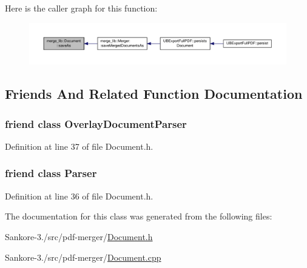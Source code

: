 Here is the caller graph for this function\-:
\nopagebreak
\begin{figure}[H]
\begin{center}
\leavevmode
\includegraphics[width=350pt]{dc/d2e/classmerge__lib_1_1_document_a6687738a8f98a95f3cafbfca7dd7c928_icgraph}
\end{center}
\end{figure}




\subsection{Friends And Related Function Documentation}
\hypertarget{classmerge__lib_1_1_document_ae318f0237f597449fb740d73ff4eaadd}{
\subsubsection[{Overlay\-Document\-Parser}]{\setlength{\rightskip}{0pt plus 5cm}friend class {\bf Overlay\-Document\-Parser}\hspace{0.3cm}{\ttfamily [friend]}}}\label{dc/d2e/classmerge__lib_1_1_document_ae318f0237f597449fb740d73ff4eaadd}


Definition at line 37 of file Document.\-h.

\hypertarget{classmerge__lib_1_1_document_ab80291af9c262f63b83fa9c16f12014d}{
\subsubsection[{Parser}]{\setlength{\rightskip}{0pt plus 5cm}friend class {\bf Parser}\hspace{0.3cm}{\ttfamily [friend]}}}\label{dc/d2e/classmerge__lib_1_1_document_ab80291af9c262f63b83fa9c16f12014d}


Definition at line 36 of file Document.\-h.



The documentation for this class was generated from the following files\-:\begin{DoxyCompactItemize}
\item 
Sankore-\/3./src/pdf-\/merger/\hyperlink{_document_8h}{Document.\-h}\item 
Sankore-\/3./src/pdf-\/merger/\hyperlink{_document_8cpp}{Document.\-cpp}\end{DoxyCompactItemize}
